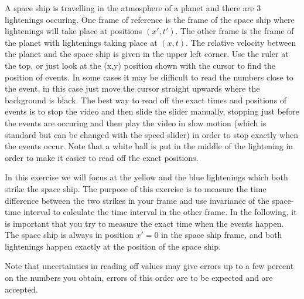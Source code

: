 {\begin{multicols}{2}
A space ship is travelling in the atmosphere of a planet and there are 3 lightenings occuring. One frame of reference is the frame of the space ship where lightenings will take place at positions $(x',t')$. The other frame is the frame of the planet with lightenings taking place at $(x,t)$. The relative velocity between the planet and the space ship is given in the upper left corner. Use the ruler at the top, or just look at the (x,y) position shown with the cursor to find the position of events. In some cases it may be difficult to read the numbers close to the event, in this case just move the cursor straight upwards where the background is black. The best way to read off the exact times and positions of events is to stop the video and then slide the slider manually, stopping just before the events are occuring and then play the video in slow motion (which is standard but can be changed with the speed slider) in order to stop exactly when the events occur. Note that a white ball is put in the middle of the lightening in order to make it easier to read off the exact positions.

 In this exercise we will focus at the yellow and the blue lightenings which both strike the space ship. The purpose of this exercise is to measure the time difference between the two strikes in your frame and use invariance of the space-time interval to calculate the time interval in the other frame. In the following, it is important that you try to measure the exact time when the events happen. The space ship is always in position $x'=0$ in the space ship frame, and both lightenings happen exactly at the position of the space ship.

Note that uncertainties in reading off values may give errors up to a few percent on the numbers you obtain, errors of this order are to be expected and are accepted.



\end{multicols}}

